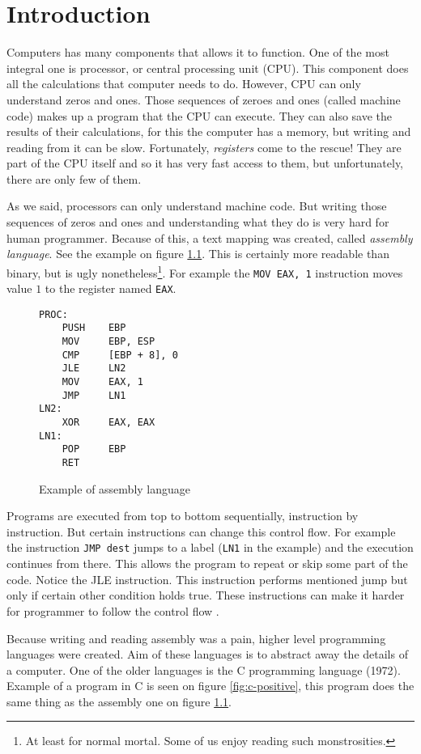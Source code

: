 \chapter{Introduction}
Computers has many components that allows it to function. One of the most integral one is processor, or central processing unit (CPU).
This component does all the calculations that computer needs to do. However, CPU can only understand
zeros and ones. Those sequences of zeroes and ones (called machine code) makes up a program that the CPU can execute.
They can also save the results of their calculations, for this the computer
has a memory, but writing and reading from it can be slow. Fortunately, \textit{registers} come to
the rescue! They are part of the CPU itself and so it has very fast access to them, but unfortunately,
there are only few of them.

As we said, processors can only understand machine code. But writing those sequences of zeros and ones and understanding
what they do is very hard for human programmer. Because of this, a text mapping was created,
called \textit{assembly language}. See the example on figure \ref{fig:assembly-example}.
This is certainly more readable than binary, but is ugly nonetheless\footnote{At least for normal mortal. Some of us enjoy reading such monstrosities.}.
For example the \texttt{MOV EAX, 1} instruction moves value $1$ to the register named \texttt{EAX}.

\begin{figure}\label{fig:assembly-example}
\begin{lstlisting}
PROC:
    PUSH    EBP
    MOV     EBP, ESP
    CMP     [EBP + 8], 0
    JLE     LN2
    MOV     EAX, 1
    JMP     LN1
LN2:
    XOR     EAX, EAX
LN1:
    POP     EBP
    RET
\end{lstlisting}
\caption{Example of assembly language}
\end{figure}

Programs are executed from top to bottom sequentially, instruction by instruction. But certain instructions can change this control flow. For example the instruction \texttt{JMP dest}
jumps to a label (\texttt{LN1} in the example) and the execution continues from there. This allows the program to repeat or skip some part of the code.
Notice the JLE instruction. This instruction performs mentioned jump but only if certain other condition holds true.
These instructions can make it harder for programmer to follow the control flow \cite{gotobad}.

Because writing and reading assembly was a pain, higher level programming languages were created.
Aim of these languages is to abstract away the details of a computer. One of the older languages is the C programming language (1972).
Example of a program in C is seen on figure \ref{fig:c-positive}, this program does the same thing as the assembly one on figure \ref{fig:assembly-example}.

